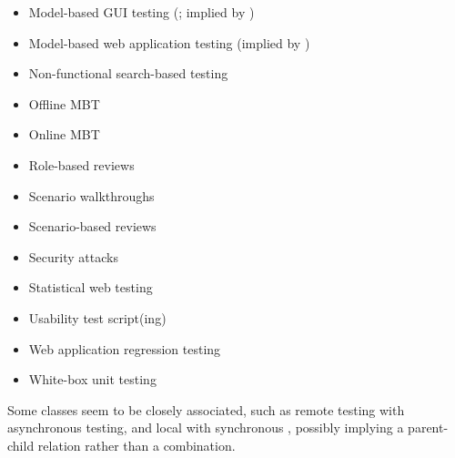 \begin{itemize}
        \item Model-based GUI testing (\citealp[Tab.~1]{DoğanEtAl2014}; implied
              by \citealp[p.~356]{SakamotoEtAl2013})
        \item Model-based web application testing (implied by
              \citealp[p.~356]{SakamotoEtAl2013})
        \item Non-functional search-based testing \citep[Tab.~1]{DoğanEtAl2014}
        \item Offline MBT \citepISTQB{}
        \item Online MBT \citepISTQB{}
        \item Role-based reviews \citepISTQB{}
        \item Scenario walkthroughs \citep[Fig.~4]{Gerrard2000a}
        \item Scenario-based reviews \citepISTQB{}
        \item Security attacks \citepISTQB{}
        \item Statistical web testing \citep[p.~185]{DoğanEtAl2014}
        \item Usability test script(ing) \citepISTQB{}
        \item Web application regression testing \cite[Tab.~21]{DoğanEtAl2014}
        \item White-box unit testing \citep[pp.~345-346]{SakamotoEtAl2013}
    \end{itemize}

    Some classes seem to be closely associated, such as remote testing
    with asynchronous testing, and local with synchronous \citep{JardEtAl1999},
    possibly implying a parent-child relation rather than a combination.

\fi